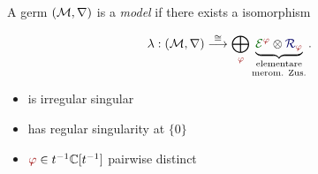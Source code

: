 \begin{defn}
  \def\myPhi{\textcolor{red!60!black}{\phi}}
  \def\myE{\textcolor{green!40!black}{\cE^{\myPhi}}}
  A germ $(\mathcal{M},\nabla)$ is a \emph{model} if there exists a isomorphism
  \begin{multicols}{2}
    \[
      \lambda:(\cM,\nabla)
      \overset{\cong}{\longrightarrow}
      \bigoplus_{~\tikzmark{e3}\!\!\myPhi}
      \underset{\text{merom. Zus.}}{%
        \underset{\text{elementare}}{%
          \underbrace{%
            \overset{\tikzmark{e2}}{\myE}
            \otimes
            \overset{\tikzmark{e1}}{\textcolor{blue!40!black}{\cR_{\myPhi}}}
          }
        }
      }\,.
    \]
    \columnbreak
    \begin{itemize}
      \item[\tikzmarkb{n2}{green}] is irregular singular
      \item[\tikzmarkc{n1}{blue}] has regular singularity at $\{0\}$
      \item[\tikzmarkc{n3}{red}] $\myPhi\in t^{-1}\C[t^{-1}]$ pairwise distinct
    \end{itemize}
  \end{multicols}
\end{defn}
